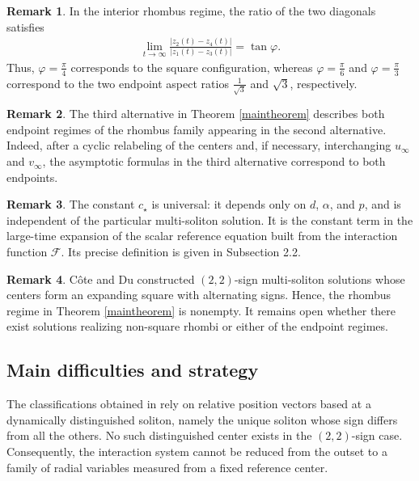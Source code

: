 \documentclass[reqno]{amsart}
\theoremstyle{plain}
\theoremstyle{definition}
\newtheorem{remark}{Remark}[section]
\numberwithin{equation}{section}
\begin{document}
\begin{remark}
In the interior rhombus regime, the ratio of the two diagonals satisfies
\begin{align*}
\lim_{t\to\infty}\frac{|z_2(t)-z_4(t)|}{|z_1(t)-z_3(t)|}=\tan{\varphi}.
\end{align*}
Thus, $\varphi=\frac{\pi}{4}$ corresponds to the square configuration, whereas $\varphi=\frac{\pi}{6}$ and $\varphi=\frac{\pi}{3}$ correspond to the two endpoint aspect ratios $\frac{1}{\sqrt3}$ and $\sqrt3$, respectively.
\end{remark}



\begin{remark}
The third alternative in Theorem \ref{maintheorem} describes both endpoint regimes of the rhombus family appearing in the second alternative. Indeed, after a cyclic relabeling of the centers and, if necessary, interchanging $u_{\infty}$ and $v_{\infty}$, the asymptotic formulas in the third alternative correspond to both endpoints.
\end{remark}


\begin{remark}
The constant $c_{\star}$ is universal: it depends only on $d$, $\alpha$, and $p$, and is independent of the particular multi-soliton solution. It is the constant term in the large-time expansion of the scalar reference equation built from the interaction function $\mathcal F$. Its precise definition is given in Subsection 2.2.
\end{remark}

\begin{remark}
C\^{o}te and Du \cite{CD} constructed $(2,2)$-sign multi-soliton solutions whose centers form an expanding square with alternating signs. Hence, the rhombus regime in Theorem \ref{maintheorem} is nonempty. It remains open whether there exist solutions realizing non-square rhombi or either of the endpoint regimes.
\end{remark}

\subsection{Main difficulties and strategy}

The classifications obtained in \cite{I2,I3} rely on relative position vectors based at a dynamically distinguished soliton, namely the unique soliton whose sign differs from all the others. No such distinguished center exists in the $(2,2)$-sign case. Consequently, the interaction system cannot be reduced from the outset to a family of radial variables measured from a fixed reference center.
\end{document}
